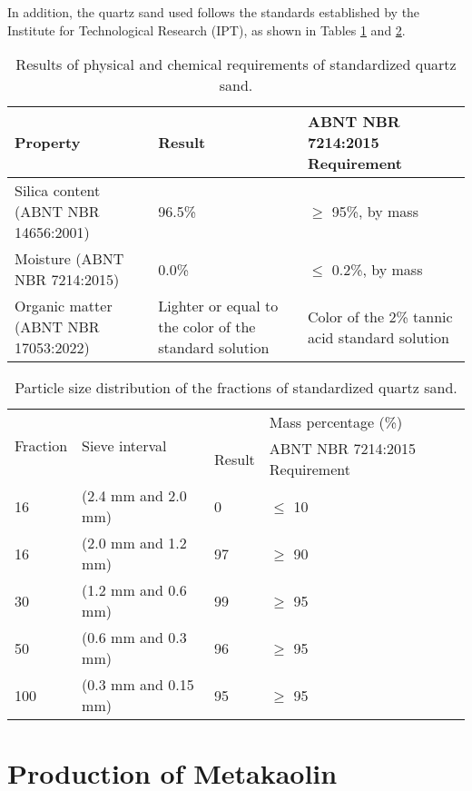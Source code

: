 In addition, the quartz sand used follows the standards established by the Institute for Technological Research (IPT), as shown in Tables \ref{tab:quartz_sand_properties} and \ref{tab:quartz_sand_granulometry}.

\begin{table}[H]
    \caption{Results of physical and chemical requirements of standardized quartz sand.}
    \label{tab:quartz_sand_properties}
    \center
    \begin{tabular}{p{} p{} p{}}
        \hline
        Property & Result & ABNT NBR 7214:2015 Requirement \\
        \hline
        Silica content (ABNT NBR 14656:2001) & 96.5\% & $\geq$ 95\%, by mass \\
        Moisture (ABNT NBR 7214:2015) & 0.0\% & $\leq$ 0.2\%, by mass \\
        Organic matter (ABNT NBR 17053:2022) & Lighter or equal to the color of the standard solution & Color of the 2\% tannic acid standard solution \\
        \hline
    \end{tabular}
\end{table}

\begin{table}[H]
    \caption{Particle size distribution of the fractions of standardized quartz sand.}
    \label{tab:quartz_sand_granulometry}
    \centering
    \begin{tabular}{p{} p{} p{} p{}}
        \hline
        \multirow{2}{*}{Fraction} & \multirow{2}{*}{Sieve interval} & \multicolumn{2}{c}{Mass percentage (\%)} \\ \cline{3-4}       
        & & Result & ABNT NBR 7214:2015 Requirement \\
        \hline
        16 & (2.4 mm and 2.0 mm) & 0 & $\leq$ 10 \\
        16 & (2.0 mm and 1.2 mm) & 97 & $\geq$ 90 \\
        30 & (1.2 mm and 0.6 mm) & 99 & $\geq$ 95 \\
        50 & (0.6 mm and 0.3 mm) & 96 & $\geq$ 95 \\
        100 & (0.3 mm and 0.15 mm) & 95 & $\geq$ 95 \\
        \hline
    \end{tabular}
\end{table}

\section{Production of Metakaolin}
\label{sec:production_of_metakaolin}

